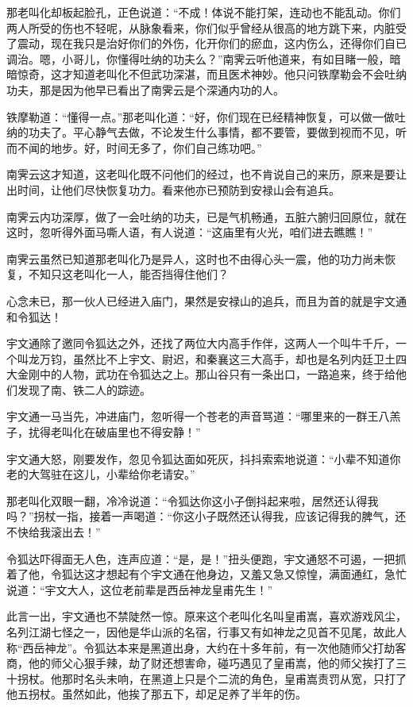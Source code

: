 \documentclass[12pt,oneside]{book}
\begin{document}
那老叫化却板起脸孔，正色说道：``不成！体说不能打架，连动也不能乱动。你们两人所受的伤也不轻呢，从脉象看来，你们似乎曾经从很高的地方跳下来，内脏受了震动，现在我只是治好你们的外伤，化开你们的瘀血，这内伤么，还得你们自已调治。嗯，小哥儿，你懂得吐纳的功夫么？''南霁云听他道来，有如目睹一般，暗暗惊奇，这才知道老叫化不但武功深湛，而且医术神妙。他只问铁摩勒会不会吐纳功夫，那是因为他早已看出了南霁云是个深通内功的人。

铁摩勒道：``懂得一点。''那老叫化道：``好，你们现在已经精神恢复，可以做一做吐纳的功夫了。平心静气去做，不论发生什么事情，都不要管，要做到视而不见，听而不闻的地步。好，时间无多了，你们自己练功吧。''

南霁云这才知道，这老叫化既不问他们的经过，也不肯说自己的来历，原来是要让出时间，让他们尽快恢复功力。看来他亦已预防到安禄山会有追兵。

南霁云内功深厚，做了一会吐纳的功夫，已是气机畅通，五脏六腑归回原位，就在这时，忽听得外面马嘶人语，有人说道：``这庙里有火光，咱们进去瞧瞧！''

南霁云虽然已知道那老叫化乃是异人，这时也不由得心头一震，他的功力尚未恢复，不知只这老叫化一人，能否挡得住他们？

心念未已，那一伙人已经进入庙门，果然是安禄山的追兵，而且为首的就是宇文通和令狐达！

宇文通除了邀同令狐达之外，还找了两位大内高手作伴，这两人一个叫牛千斤，一个叫龙万钧，虽然比不上宇文、尉迟，和秦襄这三大高手，却也是名列内廷卫土四大金刚中的人物，武功在令狐达之上。那山谷只有一条出口，一路追来，终于给他们发现了南、铁二人的踪迹。

宇文通一马当先，冲进庙门，忽听得一个苍老的声音骂道：``哪里来的一群王八羔子，扰得老叫化在破庙里也不得安静！''

宇文通大怒，刚要发作，忽见令狐达面如死灰，抖抖索索地说道：``小辈不知道你老的大驾驻在这儿，小辈给你老请安。''

那老叫化双眼一翻，冷冷说道：``令狐达你这小子倒抖起来啦，居然还认得我吗？''拐杖一指，接着一声喝道：``你这小子既然还认得我，应该记得我的脾气，还不快给我滚出去！''

令狐达吓得面无人色，连声应道：``是，是！''扭头便跑，宇文通怒不可遏，一把抓着了他，令狐达这才想起有个宇文通在他身边，又羞又急又惊惶，满面通红，急忙说道：``宇文大人，这位老前辈是西岳神龙皇甫先生！''

此言一出，宇文通也不禁陡然一惊。原来这个老叫化名叫皇甫嵩，喜欢游戏风尘，名列江湖七怪之一，因他是华山派的名宿，行事又有如神龙之见首不见尾，故此人称``西岳神龙''。令狐达本来是黑道出身，大约在十多年前，有一次他随师父打劫客商，他的师父心狠手辣，劫了财还想害命，碰巧遇见了皇甫嵩，他的师父挨打了三十拐杖。他那时名头未响，在黑道上只是个二流的角色，皇甫嵩责罚从宽，只打了他五拐杖。虽然如此，他挨了那五下，却足足养了半年的伤。
\end{document}
